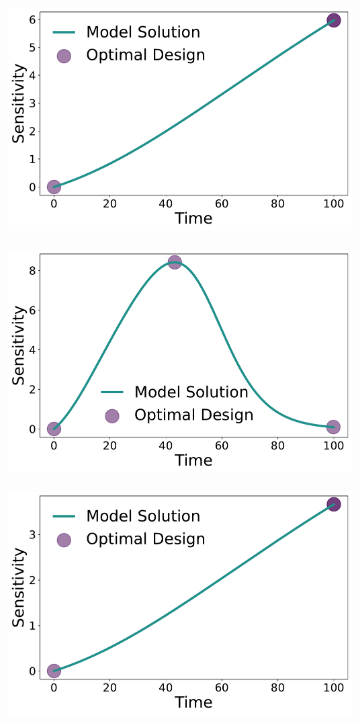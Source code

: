 \documentclass[graybox]{svmult}
\begin{document}
\begin{figure}[H]
\begin{subfigure}{.5\textwidth}
    \end{subfigure}
    \begin{subfigure}{.5\textwidth}
      \centering
      \includegraphics[scale=0.25]{Figures/Fig7c.pdf}
    \end{subfigure}
    \begin{subfigure}{.5\textwidth}
        \centering
        \includegraphics[scale=0.25]{Figures/Fig7d.pdf}
    \end{subfigure}
    \begin{subfigure}{.5\textwidth}
        \centering
        \includegraphics[scale=0.25]{Figures/Fig7e.pdf}

\end{subfigure}
\end{figure}
\end{document}
